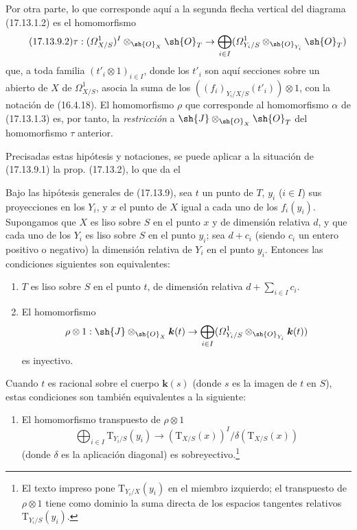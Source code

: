 \begin{env}[17.13.9]
Por otra parte, lo que corresponde aquí a la segunda flecha vertical del diagrama (17.13.1.2) es el homomorfismo
\[
\label{IV.17.13.9.2}
\tag{17.13.9.2}
\tau:(\varOmega^1_{X/S})^I\otimes_{\sh{O}_X}\sh{O}_T\to\bigoplus_{i\in I}(\varOmega^1_{Y_i/S}\otimes_{\sh{O}_{Y_i}}\sh{O}_T)
\]
que, a toda familia $(t'_i\otimes1)_{i\in I}$, donde los $t'_i$ son aquí secciones sobre un abierto de $X$ de $\varOmega^1_{X/S}$, asocia la suma de los $((f_i)_{Y_i/X/S}(t'_i))\otimes1$, con la notación de (16.4.18). El homomorfismo $\rho$ que corresponde al homomorfismo $\alpha$ de (17.13.1.3) es, por tanto, la \emph{restricción} a $\sh{J}\otimes_{\sh{O}_X}\sh{O}_T$ del homomorfismo $\tau$ anterior.

Precisadas estas hipótesis y notaciones, se puede aplicar a la situación de (17.13.9.1) la prop. (17.13.2), lo que da el
\end{env}

\begin{corollary}[17.13.10]
\label{IV.17.13.10}
Bajo las hipótesis generales de \textup{(17.13.9)}, sea $t$ un punto de $T$, $y_i$ \textup{($i\in I$)} sus proyecciones en los $Y_i$, y $x$ el punto de $X$ igual a cada uno de los $f_i(y_i)$. Supongamos que $X$ es liso sobre $S$ en el punto $x$ y de dimensión relativa $d$, y que cada uno de los $Y_i$ es liso sobre $S$ en el punto $y_i$; sea $d+c_i$ \textup{(}siendo $c_i$ un entero positivo o negativo\textup{)} la dimensión relativa de $Y_i$ en el punto $y_i$. Entonces las condiciones siguientes son equivalentes:


\begin{enumerate}
  \item[\textup{a)}] $T$ es liso sobre $S$ en el punto $t$, de dimensión relativa $d+\sum_{i\in I}c_i$.
  \item[\textup{b)}] El homomorfismo
  \[
  \rho\otimes1:\sh{J}\otimes_{\sh{O}_X}\boldsymbol k(t)\to\bigoplus_{i\in I}(\varOmega^1_{Y_i/S}\otimes_{\sh{O}_{Y_i}}\boldsymbol k(t))
  \]
  es inyectivo.
\end{enumerate}
Cuando $t$ es racional sobre el cuerpo $\boldsymbol k(s)$ \textup{(}donde $s$ es la imagen de $t$ en $S$\textup{)}, estas condiciones son también equivalentes a la siguiente:
\begin{enumerate}
  \item[\textup{b$'$)}] El homomorfismo transpuesto de $\rho\otimes1$
  \[
  \bigoplus_{i\in I}\mathrm{T}_{Y_i/S}(y_i)\to(\mathrm{T}_{X/S}(x))^I/\delta(\mathrm{T}_{X/S}(x))
  \]
  (donde $\delta$ es la aplicación diagonal) es sobreyectivo.\footnote{El texto impreso pone $\mathrm{T}_{Y_i/X}(y_i)$ en el miembro izquierdo; el transpuesto de $\rho\otimes1$ tiene como dominio la suma directa de los espacios tangentes relativos $\mathrm{T}_{Y_i/S}(y_i)$.}
\end{enumerate}
\end{corollary}

